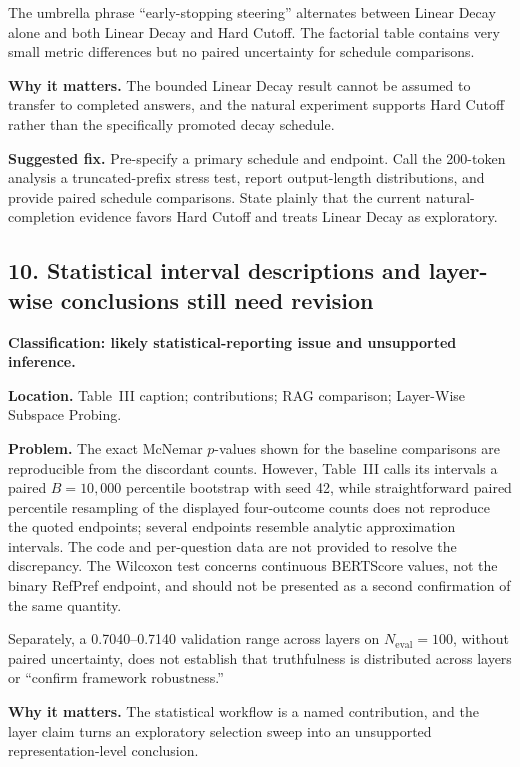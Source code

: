 \documentclass[11pt]{article}
\begin{document}
The umbrella phrase ``early-stopping steering'' alternates between Linear Decay alone and both Linear Decay and Hard Cutoff.  The factorial table contains very small metric differences but no paired uncertainty for schedule comparisons.

\textbf{Why it matters.} The bounded Linear Decay result cannot be assumed to transfer to completed answers, and the natural experiment supports Hard Cutoff rather than the specifically promoted decay schedule.

\textbf{Suggested fix.} Pre-specify a primary schedule and endpoint.  Call the 200-token analysis a truncated-prefix stress test, report output-length distributions, and provide paired schedule comparisons.  State plainly that the current natural-completion evidence favors Hard Cutoff and treats Linear Decay as exploratory.

\subsection*{10. Statistical interval descriptions and layer-wise conclusions still need revision}

\textbf{Classification: likely statistical-reporting issue and unsupported inference.}

\textbf{Location.} Table~III caption; contributions; RAG comparison; Layer-Wise Subspace Probing.

\textbf{Problem.} The exact McNemar $p$-values shown for the baseline comparisons are reproducible from the discordant counts.  However, Table~III calls its intervals a paired $B=10{,}000$ percentile bootstrap with seed 42, while straightforward paired percentile resampling of the displayed four-outcome counts does not reproduce the quoted endpoints; several endpoints resemble analytic approximation intervals.  The code and per-question data are not provided to resolve the discrepancy.  The Wilcoxon test concerns continuous BERTScore values, not the binary RefPref endpoint, and should not be presented as a second confirmation of the same quantity.

Separately, a 0.7040--0.7140 validation range across layers on $N_{\text{eval}}=100$, without paired uncertainty, does not establish that truthfulness is distributed across layers or ``confirm framework robustness.''

\textbf{Why it matters.} The statistical workflow is a named contribution, and the layer claim turns an exploratory selection sweep into an unsupported representation-level conclusion.
\end{document}
